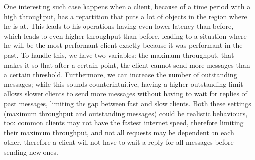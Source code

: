 One interesting such case happens when a client, because of a time period with a high throughput, has a repartition that puts a lot of objects in the region where he is at. This leads to his operations having even lower latency than before, which leads to even higher throughput than before, leading to a situation where he will be the most performant client exactly because it was performant in the past. To handle this, we have two variables: the maximum throughput, that makes it so that after a certain point, the client cannot send more messages than a certain threshold. Furthermore, we can increase the number of outstanding messages; while this sounds counterintuitive, having a higher outstanding limit allows slower clients to send more messages without having to wait for replies of past messages, limiting the gap between fast and slow clients. Both these settings (maximum throughput and outstanding messages) could be realistic behaviours, too: common clients may not have the fastest internet speed, therefore limiting their maximum throughput, and not all requests may be dependent on each other, therefore a client will not have to wait a reply for all messages before sending new ones.


